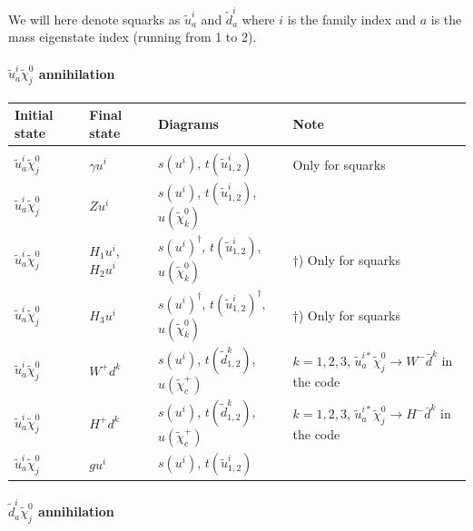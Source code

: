 \documentclass[a4paper,10pt,oneside]{book}
\newcommand{\tabspace}{\\[-2.5ex]}
\begin{document}
\smallskip


We will here denote squarks as $\tilde{u}^i_a$ and $\tilde{d}^i_a$ where $i$ is the family index and $a$ is the mass eigenstate index (running from 1 to 2).

\paragraph{$\tilde{u}^i_{a} \tilde{\chi}_{j}^{0}$ annihilation}

\begin{center}
\begin{tabular}{llll} \hline
{\bfseries Initial state} & {\bfseries Final state} &
{\bfseries Diagrams} & {\bfseries Note} \\ \hline \tabspace
$\tilde{u}^i_a \tilde{\chi}_{j}^0$ & $\gamma u^i$ &
$s(u^{i})$, $t(\tilde{u}^i_{1,2})$ 
& Only for squarks \\
$\tilde{u}^i_a \tilde{\chi}_{j}^0$ & $Z u^i$ &
$s(u^{i})$, $t(\tilde{u}^i_{1,2})$, $u(\tilde{\chi}_k^0)$ \\
$\tilde{u}^i_a \tilde{\chi}_{j}^0$ & $H_{1} u^i$, $H_{2} u^i$ &
$s(u^{i})^\dagger$, $t(\tilde{u}^i_{1,2})$, $u(\tilde{\chi}_k^0)$
& $\dagger$) Only for squarks \\
$\tilde{u}^i_a \tilde{\chi}_{j}^0$ & $H_{3}u^i$  &
$s(u^{i})^\dagger$, $t(\tilde{u}^i_{1,2})^\dagger$, $u(\tilde{\chi}_k^0)$
& $\dagger$) Only for squarks  \\ 
$\tilde{u}^i_a \tilde{\chi}_{j}^0$ & $W^+ d^k$  &
$s(u^i)$, $t(\tilde{d}^k_{1,2})$, $u(\tilde{\chi}_c^+)$ 
& \parbox[t]{4cm}{$k=1,2,3$, $\tilde{u}^{i*}_a \tilde{\chi}_{j}^0 \to W^- \bar{d}^k$ in the code} \\
$\tilde{u}^i_a \tilde{\chi}_{j}^0$ & $H^+ d^k$  &
$s(u^i)$, $t(\tilde{d}^k_{1,2})$, $u(\tilde{\chi}_c^+)$
& \parbox[t]{4cm}{$k=1,2,3$, $\tilde{u}^{i*}_a \tilde{\chi}_{j}^0 \to H^- \bar{d}^k$ in the code} \\ 
$\tilde{u}^i_a \tilde{\chi}_{j}^0$ & $g u^i$  &
$s(u^i)$, $t(\tilde{u}^i_{1,2})$ \\ \hline
\end{tabular}
\end{center}

\paragraph{$\tilde{d}^i_{a} \tilde{\chi}_{j}^{0}$ annihilation}
\end{document}

